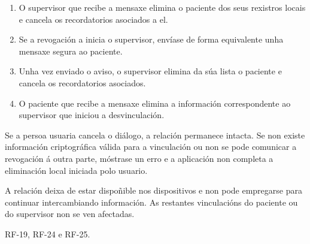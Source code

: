 \begin{description}
\begin{enumerate}
    \item O supervisor que recibe a mensaxe elimina o paciente dos seus
    rexistros locais e cancela os recordatorios asociados a el.

    \item Se a revogación a inicia o supervisor, envíase de forma equivalente
    unha mensaxe segura ao paciente.

    \item Unha vez enviado o aviso, o supervisor elimina da súa lista o paciente
    e cancela os recordatorios asociados.

    \item O paciente que recibe a mensaxe elimina a información correspondente
    ao supervisor que iniciou a desvinculación.
\end{enumerate}

\item[Fluxos alternativos:] Se a persoa usuaria cancela o diálogo, a relación
permanece intacta. Se non existe información criptográfica válida para a
vinculación ou non se pode comunicar a revogación á outra parte, móstrase un
erro e a aplicación non completa a eliminación local iniciada polo usuario.

\item[Postcondicións:] A relación deixa de estar dispoñible nos dispositivos e
non pode empregarse para continuar intercambiando información. As restantes
vinculacións do paciente ou do supervisor non se ven afectadas.

\item[Requisitos relacionados:] RF-19, RF-24 e RF-25.

\end{description}